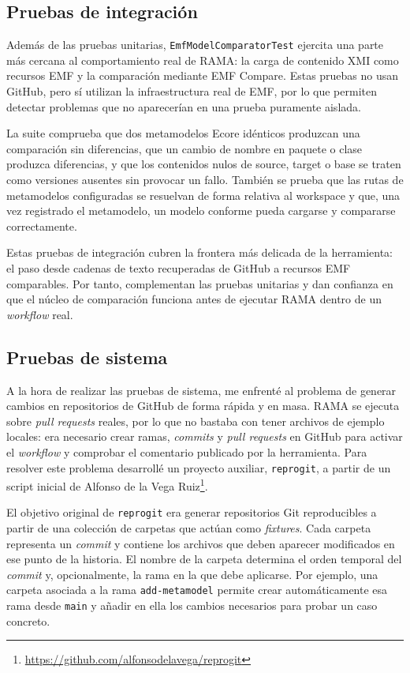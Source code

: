 \documentclass[11pt]{article}
\begin{document}
\subsection{Pruebas de integración}

Además de las pruebas unitarias, \texttt{EmfModelComparatorTest} ejercita una parte más cercana al comportamiento real de RAMA: la carga de contenido XMI como recursos EMF y la comparación mediante EMF Compare. Estas pruebas no usan GitHub, pero sí utilizan la infraestructura real de EMF, por lo que permiten detectar problemas que no aparecerían en una prueba puramente aislada.

La suite comprueba que dos metamodelos Ecore idénticos produzcan una comparación sin diferencias, que un cambio de nombre en paquete o clase produzca diferencias, y que los contenidos nulos de source, target o base se traten como versiones ausentes sin provocar un fallo. También se prueba que las rutas de metamodelos configuradas se resuelvan de forma relativa al workspace y que, una vez registrado el metamodelo, un modelo conforme pueda cargarse y compararse correctamente.

Estas pruebas de integración cubren la frontera más delicada de la herramienta: el paso desde cadenas de texto recuperadas de GitHub a recursos EMF comparables. Por tanto, complementan las pruebas unitarias y dan confianza en que el núcleo de comparación funciona antes de ejecutar RAMA dentro de un \textit{workflow} real.

\subsection{Pruebas de sistema}

A la hora de realizar las pruebas de sistema, me enfrenté al problema de generar cambios en repositorios de GitHub de forma rápida y en masa. RAMA se ejecuta sobre \textit{pull requests} reales, por lo que no bastaba con tener archivos de ejemplo locales: era necesario crear ramas, \textit{commits} y \textit{pull requests} en GitHub para activar el \textit{workflow} y comprobar el comentario publicado por la herramienta. Para resolver este problema desarrollé un proyecto auxiliar, \texttt{reprogit}, a partir de un script inicial de Alfonso de la Vega Ruiz\footnote{\url{https://github.com/alfonsodelavega/reprogit}}.

El objetivo original de \texttt{reprogit} era generar repositorios Git reproducibles a partir de una colección de carpetas que actúan como \textit{fixtures}. Cada carpeta representa un \textit{commit} y contiene los archivos que deben aparecer modificados en ese punto de la historia. El nombre de la carpeta determina el orden temporal del \textit{commit} y, opcionalmente, la rama en la que debe aplicarse. Por ejemplo, una carpeta asociada a la rama \texttt{add-metamodel} permite crear automáticamente esa rama desde \texttt{main} y añadir en ella los cambios necesarios para probar un caso concreto.
\end{document}
